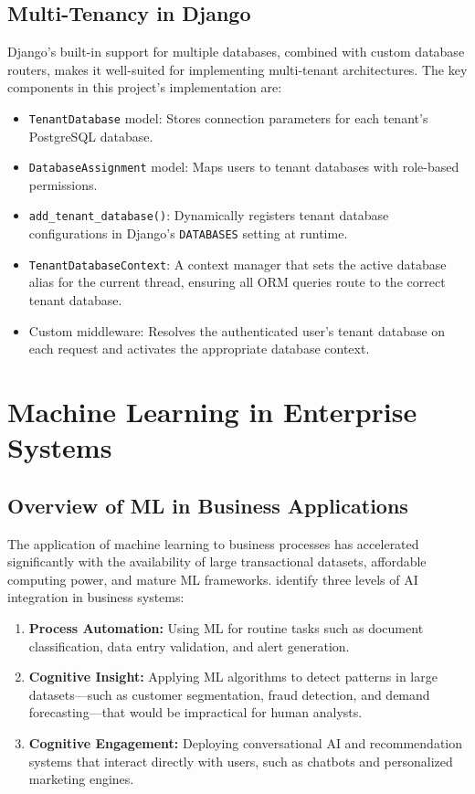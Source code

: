 \documentclass[12pt,a4paper]{report}
\begin{document}
\subsection{Multi-Tenancy in Django}

Django's built-in support for multiple databases, combined with custom database routers, makes it well-suited for implementing multi-tenant architectures. The key components in this project's implementation are:

\begin{itemize}
  \item \texttt{TenantDatabase} model: Stores connection parameters for each tenant's PostgreSQL database.
  \item \texttt{DatabaseAssignment} model: Maps users to tenant databases with role-based permissions.
  \item \texttt{add\_tenant\_database()}: Dynamically registers tenant database configurations in Django's \texttt{DATABASES} setting at runtime.
  \item \texttt{TenantDatabaseContext}: A context manager that sets the active database alias for the current thread, ensuring all ORM queries route to the correct tenant database.
  \item Custom middleware: Resolves the authenticated user's tenant database on each request and activates the appropriate database context.
\end{itemize}


\section{Machine Learning in Enterprise Systems}
\label{sec:ml_enterprise}

\subsection{Overview of ML in Business Applications}

The application of machine learning to business processes has accelerated significantly with the availability of large transactional datasets, affordable computing power, and mature ML frameworks. \citet{davenport2018ai} identify three levels of AI integration in business systems:

\begin{enumerate}[label=\arabic*.]
  \item \textbf{Process Automation:} Using ML for routine tasks such as document classification, data entry validation, and alert generation.
  \item \textbf{Cognitive Insight:} Applying ML algorithms to detect patterns in large datasets---such as customer segmentation, fraud detection, and demand forecasting---that would be impractical for human analysts.
  \item \textbf{Cognitive Engagement:} Deploying conversational AI and recommendation systems that interact directly with users, such as chatbots and personalized marketing engines.
\end{enumerate}
\end{document}
